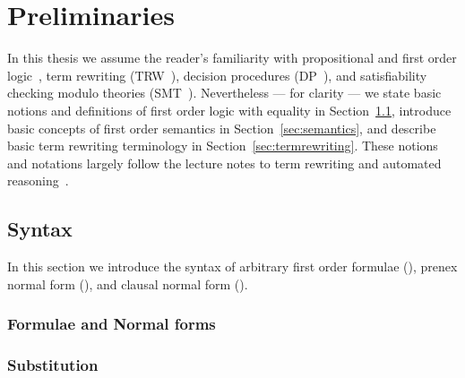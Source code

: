 
\chapter{Preliminaries}

%

In this thesis we assume the reader's familiarity with
propositional and first order logic~\cite{Huth:2004:LCS:975331},
term rewriting (TRW~\cite{Baader:1998:TR:280474}),
decision procedures (DP~\cite{Kroening:2008:DPA:1391237}),
and satisfiability checking modulo theories (SMT~\cite{Biere:2009:HSV:1550723}).
Nevertheless --- for clarity --- we state basic notions and  definitions
of first order logic with equality in Section~\ref{sec:syntax},
introduce basic concepts of first order semantics in Section~\ref{sec:semantics},
and describe basic term rewriting terminology in Section~\ref{sec:termrewriting}.
These notions and notations largely follow the lecture notes to term rewriting and automated reasoning~\cite{AM2015tr, GM2013ar}.


\section{Syntax}\label{sec:syntax}

In this section we introduce the syntax of arbitrary first order formulae (\FOF),
prenex normal form (\PNF),
and clausal normal form (\CNF).







\subsection{Formulae and Normal forms}





\subsection{Substitution}

